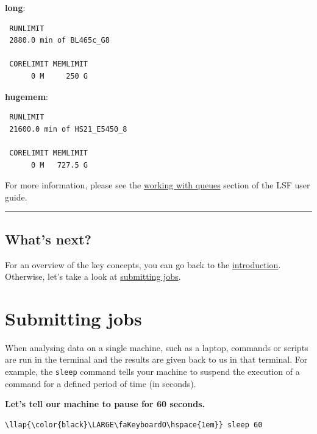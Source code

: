 \documentclass[11pt]{article}
\begin{document}
\textbf{long}:

\begin{verbatim}
 RUNLIMIT
 2880.0 min of BL465c_G8

 CORELIMIT MEMLIMIT
      0 M     250 G
\end{verbatim}

\textbf{hugemem}:

\begin{verbatim}
 RUNLIMIT
 21600.0 min of HS21_E5450_8

 CORELIMIT MEMLIMIT
      0 M   727.5 G
\end{verbatim}

    For more information, please see the
\href{https://www.ibm.com/support/knowledgecenter/SSETD4_9.1.3/lsf_admin/chap_queues_working_with.html}{working
with queues} section of the LSF user guide.

    \begin{center}\rule{0.5\linewidth}{\linethickness}\end{center}

    \subsection{What's next?}\label{whats-next}

For an overview of the key concepts, you can go back to the
\href{index.ipynb}{introduction}. Otherwise, let's take a look at
\href{submitting_jobs.ipynb}{submitting jobs}.





\newpage






    \section{Submitting jobs}\label{submitting-jobs}

When analysing data on a single machine, such as a laptop, commands or
scripts are run in the terminal and the results are given back to us in
that terminal. For example, the \texttt{sleep} command tells your
machine to suspend the execution of a command for a defined period of
time (in seconds).

\textbf{Let's tell our machine to pause for 60 seconds.}

\begin{terminalinput}
\begin{Verbatim}[commandchars=\\\{\}]
\llap{\color{black}\LARGE\faKeyboardO\hspace{1em}} sleep 60
\end{Verbatim}
\end{terminalinput}
\end{document}
